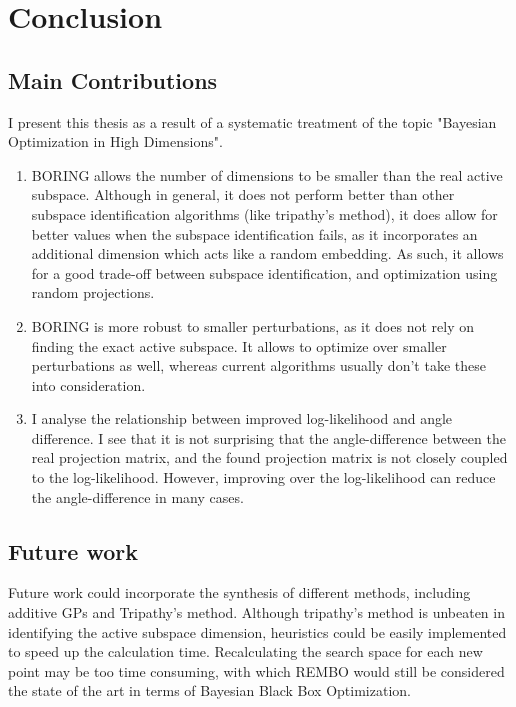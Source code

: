 \chapter{Conclusion}

\ifpdf
    \graphicspath{{Chapter7/Figs/Raster/}{Chapter7/Figs/PDF/}{Chapter7/Figs/}}
\else
    \graphicspath{{Chapter7/Figs/Vector/}{Chapter7/Figs/}}
\fi

\section{Main Contributions}
I present this thesis as a result of a systematic treatment of the topic "Bayesian Optimization in High Dimensions".

\begin{enumerate}
\item BORING allows the number of dimensions to be smaller than the real active subspace.
Although in general, it does not perform better than other subspace identification algorithms (like tripathy's method), it does allow for better values when the subspace identification fails, as it incorporates an additional dimension which acts like a random embedding.
As such, it allows for a good trade-off between subspace identification, and optimization using random projections.
\item BORING is more robust to smaller perturbations, as it does not rely on finding the exact active subspace.
It allows to optimize over smaller perturbations as well, whereas current algorithms usually don't take these into consideration.
\item I analyse the relationship between improved log-likelihood and angle difference. 
I see that it is not surprising that the angle-difference between the real projection matrix, and the found projection matrix is not closely coupled to the log-likelihood.
However, improving over the log-likelihood can reduce the angle-difference in many cases.
\end{enumerate}

\section{Future work}

Future work could incorporate the synthesis of different methods, including additive GPs and Tripathy's method.
Although tripathy's method is unbeaten in identifying the active subspace dimension, heuristics could be easily implemented to speed up the calculation time.
Recalculating the search space for each new point may be too time consuming, with which REMBO would still be considered the state of the art in terms of Bayesian Black Box Optimization.
 



